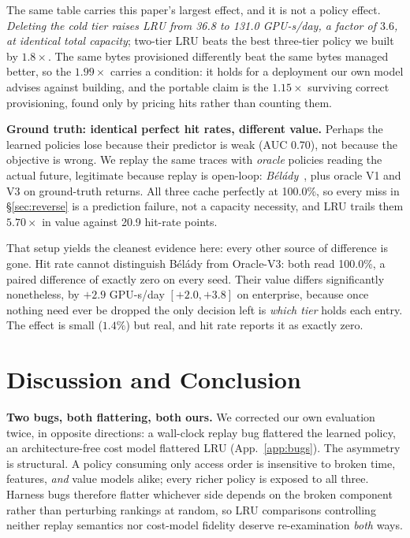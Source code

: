 \documentclass{article}
\begin{document}
The same table carries this paper's largest effect, and it is not a policy effect. \emph{Deleting the cold tier raises LRU from 36.8 to 131.0 GPU-s/day, a factor of $3.6$, at identical total capacity}; two-tier LRU beats the best three-tier policy we built by $1.8\times$. The same bytes provisioned differently beat the same bytes managed better, so the $1.99\times$ carries a condition: it holds for a deployment our own model advises against building, and the portable claim is the $1.15\times$ surviving correct provisioning, found only by pricing hits rather than counting them.

\textbf{Ground truth: identical perfect hit rates, different value.}
\label{sec:oracle}
Perhaps the learned policies lose because their predictor is weak (AUC 0.70), not because the objective is wrong. We replay the same traces with \emph{oracle} policies reading the actual future, legitimate because replay is open-loop: \emph{Bélády}~\cite{belady1966replacement}, plus oracle V1 and V3 on ground-truth returns. All three cache perfectly at 100.0\%, so every miss in \S\ref{sec:reverse} is a prediction failure, not a capacity necessity, and LRU trails them $5.70\times$ in value against 20.9 hit-rate points.

That setup yields the cleanest evidence here: every other source of difference is gone. Hit rate cannot distinguish Bélády from Oracle-V3: both read 100.0\%, a paired difference of exactly zero on every seed. Their value differs significantly nonetheless, by $+2.9$ GPU-s/day $[+2.0, +3.8]$ on enterprise, because once nothing need ever be dropped the only decision left is \emph{which tier} holds each entry. The effect is small ($1.4\%$) but real, and hit rate reports it as exactly zero.

\section{Discussion and Conclusion}
\label{sec:caution}

\textbf{Two bugs, both flattering, both ours.} We corrected our own evaluation twice, in opposite directions: a wall-clock replay bug flattered the learned policy, an architecture-free cost model flattered LRU (App.~\ref{app:bugs}). The asymmetry is structural. A policy consuming only access order is insensitive to broken time, features, \emph{and} value models alike; every richer policy is exposed to all three. Harness bugs therefore flatter whichever side depends on the broken component rather than perturbing rankings at random, so LRU comparisons controlling neither replay semantics nor cost-model fidelity deserve re-examination \emph{both} ways.
\end{document}
